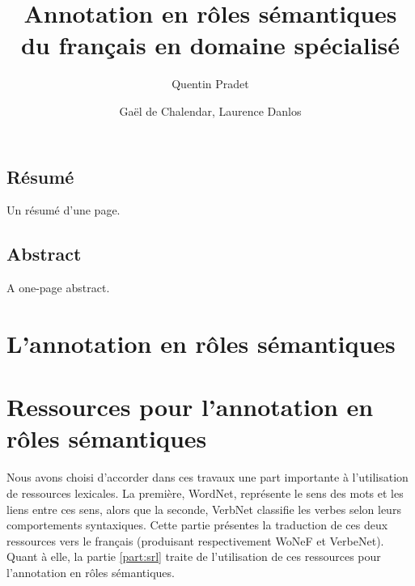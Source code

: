 \documentclass[oneside,parskip,draft]{scrbook}
\title{Annotation en rôles sémantiques \\ du français en domaine spécialisé}
\author{Quentin Pradet}
\date{Gaël de Chalendar, Laurence Danlos}
\begin{document}
\maketitle

\frontmatter



\chapter{Résumé}

Un résumé d'une page.

\chapter{Abstract}

A one-page abstract.

\setcounter{tocdepth}{3}
\tableofcontents

\mainmatter

\part{L'annotation en rôles sémantiques}





\part{Ressources pour l'annotation en rôles sémantiques}
\label{part:translation}


Nous avons choisi d'accorder dans ces travaux une part importante à
l'utilisation de ressources lexicales. La première, WordNet, représente le sens
des mots et les liens entre ces sens, alors que la seconde, VerbNet classifie
les verbes selon leurs comportements syntaxiques. Cette partie présentes la
traduction de ces deux ressources vers le français (produisant respectivement
WoNeF et VerbeNet). Quant à elle, la partie \ref{part:srl} traite de
l'utilisation de ces ressources pour l'annotation en rôles sémantiques.
\end{document}
